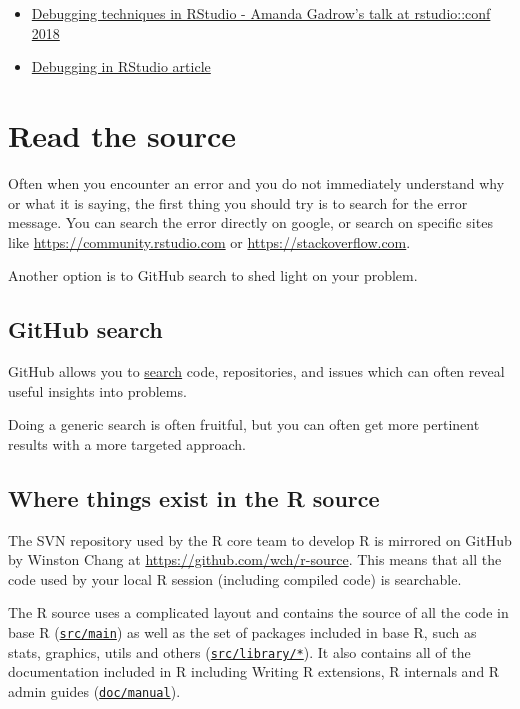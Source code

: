 \documentclass[
  letterpaper,
]{book}
\providecommand{\tightlist}{%
  \setlength{\itemsep}{0pt}\setlength{\parskip}{0pt}}\usepackage{longtable,booktabs,array}
\begin{document}
\begin{itemize}
\tightlist
\item
  \href{https://resources.rstudio.com/wistia-rstudio-conf-2018-2/debugging-techniques-in-rstudio-amanda-gadrow-4}{Debugging
  techniques in RStudio - Amanda Gadrow's talk at rstudio::conf 2018}
\item
  \href{https://support.rstudio.com/hc/en-us/articles/200713843}{Debugging
  in RStudio article}
\end{itemize}

\hypertarget{read-the-source}{%
\chapter{Read the source}\label{read-the-source}}

Often when you encounter an error and you do not immediately understand
why or what it is saying, the first thing you should try is to search
for the error message. You can search the error directly on google, or
search on specific sites like \url{https://community.rstudio.com} or
\url{https://stackoverflow.com}.

Another option is to GitHub search to shed light on your problem.

\hypertarget{github-search}{%
\section{GitHub search}\label{github-search}}

GitHub allows you to \href{https://github.com/search}{search} code,
repositories, and issues which can often reveal useful insights into
problems.

Doing a generic search is often fruitful, but you can often get more
pertinent results with a more targeted approach.

\hypertarget{where-things-exist-in-the-r-source}{%
\section{Where things exist in the R
source}\label{where-things-exist-in-the-r-source}}

The SVN repository used by the R core team to develop R is mirrored on
GitHub by Winston Chang at \url{https://github.com/wch/r-source}. This
means that all the code used by your local R session (including compiled
code) is searchable.

The R source uses a complicated layout and contains the source of all
the code in base R
(\href{https://github.com/wch/r-source/tree/trunk/src/main}{\texttt{src/main}})
as well as the set of packages included in base R, such as stats,
graphics, utils and others
(\href{https://github.com/wch/r-source/tree/trunk/src/library}{\texttt{src/library/*}}).
It also contains all of the documentation included in R including
Writing R extensions, R internals and R admin guides
(\href{https://github.com/wch/r-source/tree/trunk/doc/manual}{\texttt{doc/manual}}).
\end{document}
